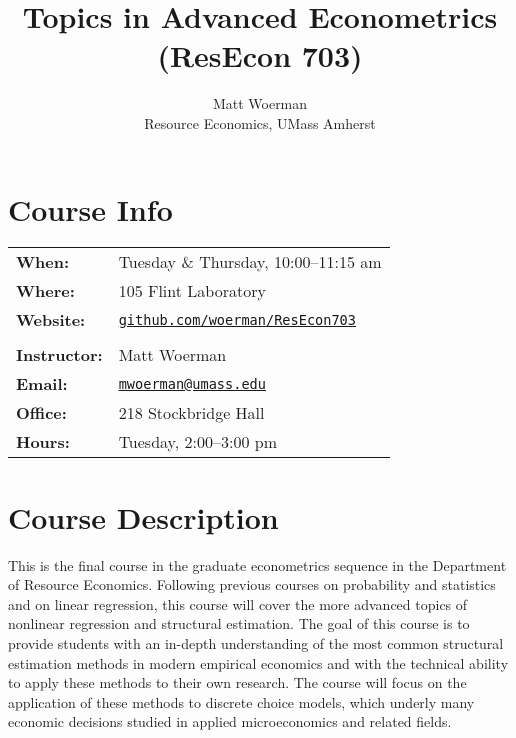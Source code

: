 \documentclass[11pt,letterpaper]{article}
\newcommand{\subtitle}[1]{%
	\posttitle{%
		\par\end{center}
	\begin{center}\large#1\end{center}
	\vskip0.5em}%
}
\begin{document}
\title{Topics in Advanced Econometrics (ResEcon 703)}
\subtitle{Fall 2019 Syllabus\vspace{-2ex}}
\author{Matt Woerman\\Resource Economics, UMass Amherst}
\date{\vspace{-5ex}}

\maketitle

\section*{Course Info}

\begin{tabular}{ll} 
	\textbf{When:} & Tuesday \& Thursday, 10:00--11:15 am \\
	\textbf{Where:} & 105 Flint Laboratory \\
	\textbf{Website:} & \href{https://github.com/woerman/ResEcon703}{\texttt{github.com/woerman/ResEcon703}} \\
	\\
	\textbf{Instructor:} & Matt Woerman \\
	\textbf{Email:} & \href{mailto:mwoerman@umass.edu}{\texttt{mwoerman@umass.edu}} \\
	\textbf{Office:} & 218 Stockbridge Hall \\
	\textbf{Hours:} & Tuesday, 2:00--3:00 pm
\end{tabular} 

\section*{Course Description}

This is the final course in the graduate econometrics sequence in the Department of Resource Economics. Following previous courses on probability and statistics and on linear regression, this course will cover the more advanced topics of nonlinear regression and structural estimation. The goal of this course is to provide students with an in-depth understanding of the most common structural estimation methods in modern empirical economics and with the technical ability to apply these methods to their own research. The course will focus on the application of these methods to discrete choice models, which underly many economic decisions studied in applied microeconomics and related fields.
\end{document}
